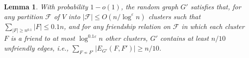 \documentclass[11pt]{article}
\newtheorem{lemma}[theorem]{Lemma}
\theoremstyle{definition}
\newcommand{\fset}{{\mathcal{F}}}
\newcommand{\eps}{{\varepsilon}}
\begin{document}


\begin{lemma} \label{lem:small}
With probability $1-o(1)$, the random graph $G'$ satisfies that, for any partition $\fset$ of $V$ into $|\fset|\le O(n/\log^{\eps} n)$ clusters such that $\sum_{|F|\ge n^{0.1}}|F|\le 0.1n$, and for any friendship relation on $\fset$ in which each cluster $F$ is a friend to at most $\log^{0.1 \eps} n$ other clusters, $G'$ contains at least $n/10$ unfriendly edges, i.e., $\sum_{F\not\sim F'}|E_{G'}(F,F')|\ge n/10$.
\end{lemma}
\end{document}
